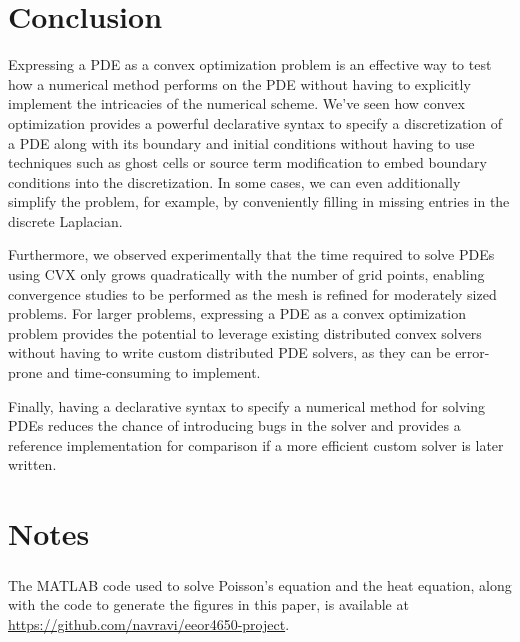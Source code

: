 \documentclass[conference]{IEEEtran}
\begin{document}
\section{Conclusion}

Expressing a PDE as a convex optimization problem is an effective way to test how a numerical method performs on the PDE without having to explicitly implement the intricacies of the numerical scheme. We've seen how convex optimization provides a powerful declarative syntax to specify a discretization of a PDE along with its boundary and initial conditions without having to use techniques such as ghost cells or source term modification to embed boundary conditions into the discretization. In some cases, we can even additionally simplify the problem, for example, by conveniently filling in missing entries in the discrete Laplacian.

Furthermore, we observed experimentally that the time required to solve PDEs using CVX only grows quadratically with the number of grid points, enabling convergence studies to be performed as the mesh is refined for moderately sized problems. For larger problems, expressing a PDE as a convex optimization problem provides the potential to leverage existing distributed convex solvers without having to write custom distributed PDE solvers, as they can be error-prone and time-consuming to implement.

Finally, having a declarative syntax to specify a numerical method for solving PDEs reduces the chance of introducing bugs in the solver and provides a reference implementation for comparison if a more efficient custom solver is later written.


\section*{Notes}

The MATLAB\textsuperscript{\textregistered} code used to solve Poisson's equation and the heat equation, along with the code to generate the figures in this paper, is available at \url{https://github.com/navravi/eeor4650-project}.





\end{document}
